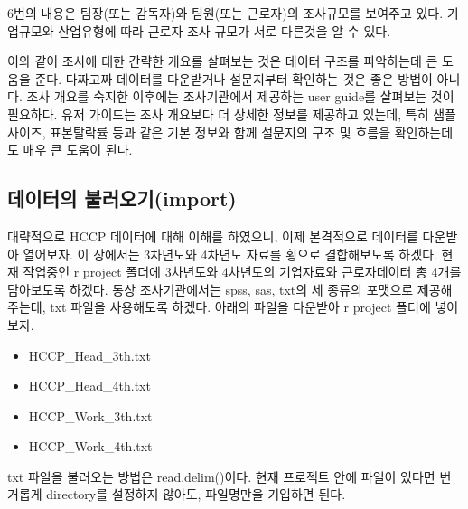 \documentclass[
]{book}
\providecommand{\tightlist}{%
  \setlength{\itemsep}{0pt}\setlength{\parskip}{0pt}}
\theoremstyle{definition}
\theoremstyle{definition}
\theoremstyle{definition}
\theoremstyle{definition}
\theoremstyle{remark}
\begin{document}
6번의 내용은 팀장(또는 감독자)와 팀원(또는 근로자)의 조사규모를 보여주고 있다. 기업규모와 산업유형에 따라 근로자 조사 규모가 서로 다른것을 알 수 있다.

이와 같이 조사에 대한 간략한 개요를 살펴보는 것은 데이터 구조를 파악하는데 큰 도움을 준다. 다짜고짜 데이터를 다운받거나 설문지부터 확인하는 것은 좋은 방법이 아니다. 조사 개요를 숙지한 이후에는 조사기관에서 제공하는 user guide를 살펴보는 것이 필요하다. 유저 가이드는 조사 개요보다 더 상세한 정보를 제공하고 있는데, 특히 샘플 사이즈, 표본탈락률 등과 같은 기본 정보와 함께 설문지의 구조 및 흐름을 확인하는데도 매우 큰 도움이 된다.

\hypertarget{uxb370uxc774uxd130uxc758-uxbd88uxb7ecuxc624uxae30import}{%
\subsection{데이터의 불러오기(import)}\label{uxb370uxc774uxd130uxc758-uxbd88uxb7ecuxc624uxae30import}}

대략적으로 HCCP 데이터에 대해 이해를 하였으니, 이제 본격적으로 데이터를 다운받아 열어보자. 이 장에서는
3차년도와 4차년도 자료를 횡으로 결합해보도록 하겠다. 현재 작업중인 r project 폴더에 3차년도와 4차년도의 기업자료와 근로자데이터 총 4개를 담아보도록 하겠다. 통상 조사기관에서는 spss, sas, txt의 세 종류의 포맷으로 제공해주는데, txt 파일을 사용해도록 하겠다. 아래의 파일을 다운받아 r project 폴더에 넣어보자.

\begin{itemize}
\tightlist
\item
  HCCP\_Head\_3th.txt
\item
  HCCP\_Head\_4th.txt
\item
  HCCP\_Work\_3th.txt
\item
  HCCP\_Work\_4th.txt
\end{itemize}

txt 파일을 불러오는 방법은 read.delim()이다. 현재 프로젝트 안에 파일이 있다면 번거롭게 directory를 설정하지 않아도, 파일명만을 기입하면 된다.
\end{document}
